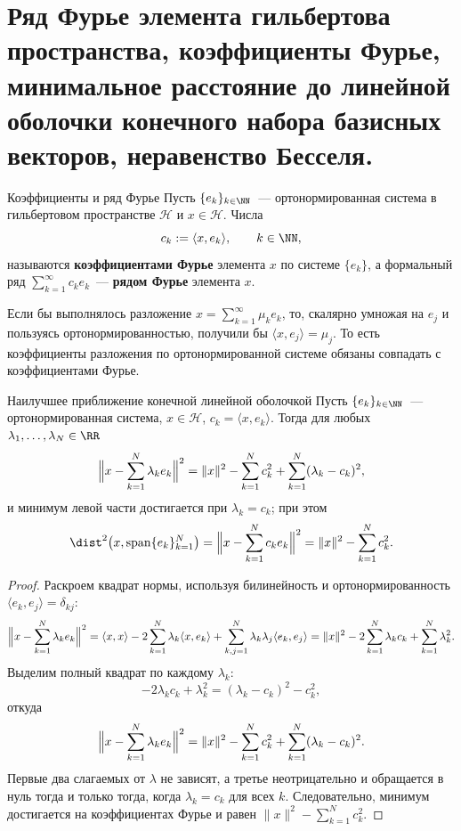
\section{Ряд Фурье элемента гильбертова пространства, коэффициенты Фурье, минимальное расстояние до линейной оболочки конечного набора базисных векторов, неравенство Бесселя.}

\begin{Definition}{Коэффициенты и ряд Фурье}{}
	Пусть $\{e_k\}_{k \in \NN}$~--- ортонормированная система в гильбертовом пространстве $\mathcal{H}$ и $x \in \mathcal{H}$. Числа
	\[
	c_k := \langle x, e_k\rangle, \qquad k \in \NN,
	\]
	называются \textbf{коэффициентами Фурье} элемента $x$ по системе $\{e_k\}$, а формальный ряд $\sum_{k=1}^{\infty} c_k e_k$~--- \textbf{рядом Фурье} элемента $x$.
\end{Definition}

\begin{Remark}{}{}
	Если бы выполнялось разложение $x = \sum_{k=1}^{\infty} \mu_k e_k$, то, скалярно умножая на $e_j$ и пользуясь ортонормированностью, получили бы $\langle x, e_j\rangle = \mu_j$. То есть коэффициенты разложения по ортонормированной системе обязаны совпадать с коэффициентами Фурье.
\end{Remark}

\begin{Theorem}{Наилучшее приближение конечной линейной оболочкой}{}
	Пусть $\{e_k\}_{k \in \NN}$~--- ортонормированная система, $x \in \mathcal{H}$, $c_k = \langle x, e_k\rangle$. Тогда для любых $\lambda_1, \ldots, \lambda_N \in \RR$
	\[
	\Bigl\| x - \sum_{k=1}^{N} \lambda_k e_k \Bigr\|^2
	= \|x\|^2 - \sum_{k=1}^{N} c_k^2 + \sum_{k=1}^{N} (\lambda_k - c_k)^2,
	\]
	и минимум левой части достигается при $\lambda_k = c_k$; при этом
	\[
	\dist^2\bigl(x, \operatorname{span}\{e_k\}_{k=1}^{N}\bigr)
	= \Bigl\| x - \sum_{k=1}^{N} c_k e_k \Bigr\|^2
	= \|x\|^2 - \sum_{k=1}^{N} c_k^2.
	\]
\end{Theorem}

\begin{proof}
	Раскроем квадрат нормы, используя билинейность и ортонормированность $\langle e_k, e_j\rangle = \delta_{kj}$:
	\[
	\Bigl\| x - \sum_{k=1}^{N} \lambda_k e_k \Bigr\|^2
	= \langle x, x\rangle - 2\sum_{k=1}^{N}\lambda_k\langle x, e_k\rangle + \sum_{k,j=1}^{N}\lambda_k\lambda_j\langle e_k, e_j\rangle
	= \|x\|^2 - 2\sum_{k=1}^{N}\lambda_k c_k + \sum_{k=1}^{N}\lambda_k^2.
	\]
	Выделим полный квадрат по каждому $\lambda_k$:
	\[
	-2\lambda_k c_k + \lambda_k^2 = (\lambda_k - c_k)^2 - c_k^2,
	\]
	откуда
	\[
	\Bigl\| x - \sum_{k=1}^{N}\lambda_k e_k \Bigr\|^2 = \|x\|^2 - \sum_{k=1}^{N} c_k^2 + \sum_{k=1}^{N}(\lambda_k - c_k)^2.
	\]
	Первые два слагаемых от $\lambda$ не зависят, а третье неотрицательно и обращается в нуль тогда и только тогда, когда $\lambda_k = c_k$ для всех $k$. Следовательно, минимум достигается на коэффициентах Фурье и равен $\|x\|^2 - \sum_{k=1}^{N} c_k^2$.
\end{proof}

